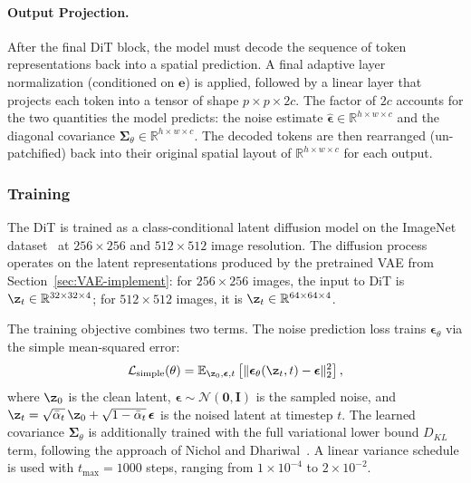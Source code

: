\documentclass[../../book-main.tex]{subfiles}
\begin{document}
\paragraph{Output Projection.}
After the final DiT block, the model must decode the sequence of
token representations back into a spatial prediction. A final
adaptive layer normalization (conditioned on $\boldsymbol{e}$) is
applied, followed by a linear layer that projects each token into a
tensor of shape $p \times p \times 2c$. The factor of $2c$ accounts
for the two quantities the model predicts: the noise estimate
$\hat{\boldsymbol{\epsilon}} \in \mathbb{R}^{h \times w \times c}$
and the diagonal covariance $\boldsymbol{\Sigma}_\theta \in
\mathbb{R}^{h \times w \times c}$. The decoded tokens are then
rearranged (un-patchified) back into their original spatial layout of
$\mathbb{R}^{h \times w \times c}$ for each output.

\subsubsection{Training}
The DiT is trained as a class-conditional latent diffusion model on
the ImageNet dataset~\citep{deng2009imagenet} at $256 \times 256$ and
$512 \times 512$ image resolution. The diffusion process operates on
the latent representations produced by the pretrained VAE from
Section~\ref{sec:VAE-implement}: for $256 \times 256$ images, the
input to DiT is $\z_t \in \mathbb{R}^{32 \times 32 \times 4}$; for
$512 \times 512$ images, it is $\z_t \in \mathbb{R}^{64 \times 64 \times 4}$.

The training objective combines two terms. The noise prediction loss
trains $\boldsymbol{\epsilon}_\theta$ via the simple mean-squared error:
\begin{equation}
\mathcal{L}_{\mathrm{simple}}(\theta) = \mathbb{E}_{\z_0,
\boldsymbol{\epsilon}, t}\left[\|\boldsymbol{\epsilon}_\theta(\z_t,
t) - \boldsymbol{\epsilon}\|_2^2\right],
\end{equation}
where $\z_0$ is the clean latent, $\boldsymbol{\epsilon} \sim
\mathcal{N}(\boldsymbol{0}, \boldsymbol{I})$ is the sampled noise,
and $\z_t = \sqrt{\bar{\alpha}_t}\,\z_0 + \sqrt{1 -
\bar{\alpha}_t}\,\boldsymbol{\epsilon}$ is the noised latent at
timestep $t$. The learned covariance $\boldsymbol{\Sigma}_\theta$ is
additionally trained with the full variational lower bound $D_{KL}$
term, following the approach of Nichol and
Dhariwal~\citep{nichol2021improved}. A linear variance schedule is
used with $t_{\max} = 1000$ steps, ranging from $1 \times 10^{-4}$ to
$2 \times 10^{-2}$.
\end{document}

